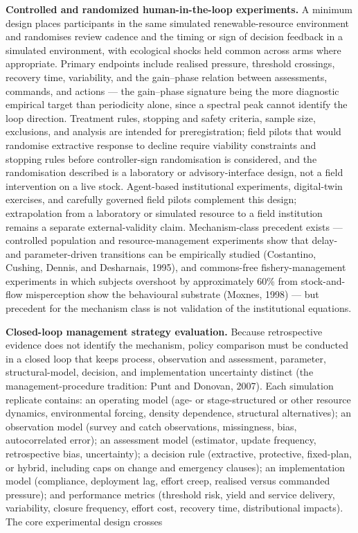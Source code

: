 \documentclass[11pt]{article}
\begin{document}
\textbf{Controlled and randomized human-in-the-loop experiments.} A
minimum design places participants in the same simulated
renewable-resource environment and randomises review cadence and the
timing or sign of decision feedback in a simulated environment, with
ecological shocks held common across arms where appropriate. Primary
endpoints include realised pressure, threshold crossings, recovery time,
variability, and the gain--phase relation between assessments, commands,
and actions --- the gain--phase signature being the more diagnostic
empirical target than periodicity alone, since a spectral peak cannot
identify the loop direction. Treatment rules, stopping and safety
criteria, sample size, exclusions, and analysis are intended for
preregistration; field pilots that would randomise extractive response
to decline require viability constraints and stopping rules before
controller-sign randomisation is considered, and the randomisation
described is a laboratory or advisory-interface design, not a field
intervention on a live stock. Agent-based institutional experiments,
digital-twin exercises, and carefully governed field pilots complement
this design; extrapolation from a laboratory or simulated resource to a
field institution remains a separate external-validity claim.
Mechanism-class precedent exists --- controlled population and
resource-management experiments show that delay- and parameter-driven
transitions can be empirically studied (Costantino, Cushing, Dennis, and
Desharnais, 1995), and commons-free fishery-management experiments in
which subjects overshoot by approximately 60\% from stock-and-flow
misperception show the behavioural substrate (Moxnes, 1998) --- but
precedent for the mechanism class is not validation of the institutional
equations.

\textbf{Closed-loop management strategy evaluation.} Because
retrospective evidence does not identify the mechanism, policy
comparison must be conducted in a closed loop that keeps process,
observation and assessment, parameter, structural-model, decision, and
implementation uncertainty distinct (the management-procedure tradition:
Punt and Donovan, 2007). Each simulation replicate contains: an
operating model (age- or stage-structured or other resource dynamics,
environmental forcing, density dependence, structural alternatives); an
observation model (survey and catch observations, missingness, bias,
autocorrelated error); an assessment model (estimator, update frequency,
retrospective bias, uncertainty); a decision rule (extractive,
protective, fixed-plan, or hybrid, including caps on change and
emergency clauses); an implementation model (compliance, deployment lag,
effort creep, realised versus commanded pressure); and performance
metrics (threshold risk, yield and service delivery, variability,
closure frequency, effort cost, recovery time, distributional impacts).
The core experimental design crosses
\end{document}
